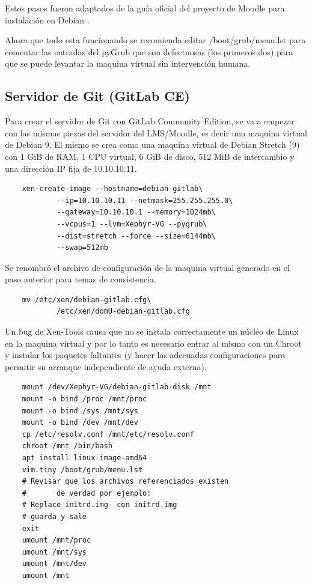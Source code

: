 Estos pasos fueron adaptados de la guía oficial del proyecto de Moodle para instalación en Debian \citep{MOODLE-Install-Debian}.

Ahora que todo esta funcionando se recomienda editar /boot/grub/menu.lst para comentar las entradas del pyGrub que son defectuosas (los primeros dos) para que se puede levantar la maquina virtual sin intervención humana.

 
\subsection{Servidor de Git (GitLab CE)}
Para crear el servidor de Git con GitLab Community Edition, se va a empezar con las mismas piezas del servidor del LMS/Moodle, es decir una maquina virtual de Debian 9. El mismo se crea como una maquina virtual de Debian Stretch (9) con 1 GiB de RAM, 1 CPU virtual, 6 GiB de disco, 512 MiB de intercambio y una dirección IP fija de 10.10.10.11.
\begin{lstlisting}
	xen-create-image --hostname=debian-gitlab\
    		--ip=10.10.10.11 --netmask=255.255.255.0\
        	--gateway=10.10.10.1 --memory=1024mb\
        	--vcpus=1 --lvm=Xephyr-VG --pygrub\
        	--dist=stretch --force --size=6144mb\
        	--swap=512mb
\end{lstlisting}

Se renombró el archivo de configuración de la maquina virtual generado en el paso anterior para temas de consistencia.

\begin{lstlisting}
	mv /etc/xen/debian-gitlab.cfg\
    		/etc/xen/domU-debian-gitlab.cfg
\end{lstlisting}

Un bug de Xen-Tools causa que no se instala correctamente un núcleo de Linux en la maquina virtual y por lo tanto es necesario entrar al mismo con un Chroot y instalar los paquetes faltantes (y hacer las adecuadas configuraciones  para permitir su arranque independiente de ayuda externa).

\begin{lstlisting}
	mount /dev/Xephyr-VG/debian-gitlab-disk /mnt
	mount -o bind /proc /mnt/proc
	mount -o bind /sys /mnt/sys
	mount -o bind /dev /mnt/dev
	cp /etc/resolv.conf /mnt/etc/resolv.conf
	chroot /mnt /bin/bash
	apt install linux-image-amd64
	vim.tiny /boot/grub/menu.lst
	# Revisar que los archivos referenciados existen
	#		de verdad por ejemplo:
	# Replace initrd.img- con initrd.img
    # guarda y sale
	exit
	umount /mnt/proc            
	umount /mnt/sys 
	umount /mnt/dev 
	umount /mnt	
\end{lstlisting}

